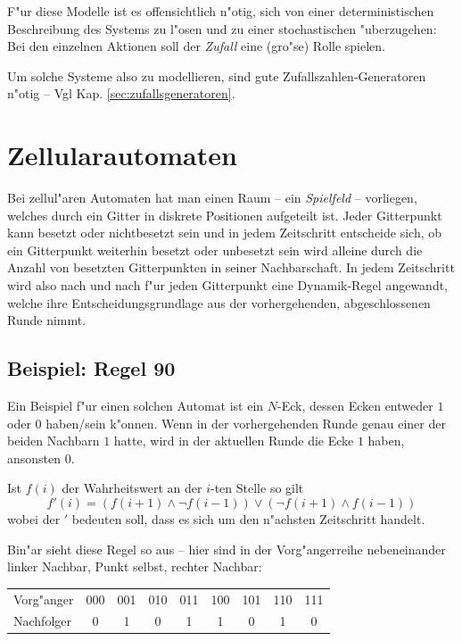 \documentclass[a4paper]{book}
\begin{document}
F"ur diese Modelle ist es offensichtlich n"otig, sich von einer
deterministischen Beschreibung des Systems zu l"osen und zu einer
stochastischen "uberzugehen: Bei den einzelnen Aktionen soll der
\emph{Zufall} eine (gro"se) Rolle spielen. 

Um solche Systeme also zu modellieren, sind gute
Zufallszahlen-Generatoren n"otig -- Vgl
Kap. \ref{sec:zufallsgeneratoren}.




\section{Zellularautomaten}
\label{sec:zellularautomaten}

Bei zellul"aren Automaten hat man einen Raum -- ein \emph{Spielfeld}
-- vorliegen, welches durch ein Gitter in diskrete Positionen
aufgeteilt ist. Jeder Gitterpunkt kann besetzt oder nichtbesetzt sein
und in jedem Zeitschritt entscheide sich, ob ein Gitterpunkt weiterhin
besetzt oder unbesetzt sein wird alleine durch die Anzahl von
besetzten Gitterpunkten in seiner Nachbarschaft. In jedem Zeitschritt
wird also nach und nach f"ur jeden Gitterpunkt eine Dynamik-Regel
angewandt, welche ihre Entscheidungsgrundlage aus der vorhergehenden,
abgeschlossenen Runde nimmt.


\subsection{Beispiel: Regel 90}
\label{sec:regel_90}


Ein Beispiel f"ur einen solchen Automat ist ein $N$-Eck, dessen Ecken
entweder $1$ oder $0$ haben/sein k"onnen. Wenn in der vorhergehenden
Runde genau einer der beiden Nachbarn $1$ hatte, wird in der aktuellen
Runde die Ecke $1$ haben, ansonsten $0$.

Ist $f(i)$ der Wahrheitswert an der $i$-ten Stelle so gilt
\begin{equation*}
  f'(i) = (f(i+1) \wedge \neg f(i-1)) \vee (\neg f(i+1) \wedge  f(i-1))
\end{equation*}
wobei der $'$ bedeuten soll, dass es sich um den n"achsten Zeitschritt handelt.

Bin"ar sieht diese Regel so aus -- hier sind in der Vorg"angerreihe
nebeneinander linker Nachbar, Punkt selbst, rechter Nachbar:

\begin{tabular}{l c c c c c c c c}
  Vorg"anger & 000 & 001 & 010 & 011 & 100 & 101 & 110 & 111 \\
  Nachfolger & 0   & 1   & 0   & 1   & 1   & 0   & 1   & 0
\end{tabular}
\end{document}
